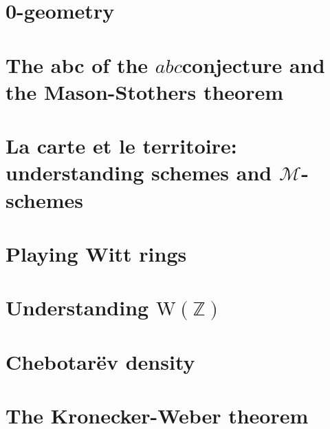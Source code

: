 \documentclass[a4paper]{memoir}
\begin{document}
\chapter{0-geometry}
\label{chapter:prep-notes}






\chapter{The abc of the \texorpdfstring{$abc$}-conjecture and the Mason-Stothers theorem}





\chapter{La carte et le territoire: understanding schemes and \texorpdfstring{$\mathcal{M}$}{M}-schemes}








\chapter{Playing Witt rings}





\chapter{Understanding \texorpdfstring{$\mathrm{W}(\mathbb{Z})$}{W(Z)}}






\chapter{Chebotar\"ev density}




\chapter{The Kronecker-Weber theorem}


\end{document}
